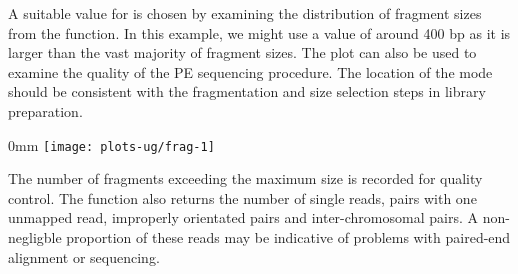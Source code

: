 \documentclass{report}\usepackage[]{graphicx}\usepackage[usenames,dvipsnames]{color}
\makeatletter
\def\maxwidth{ %
  \ifdim\Gin@nat@width>\linewidth
    \linewidth
  \else
    \Gin@nat@width
  \fi
}
\newcommand{\hlnum}[1]{\textcolor[rgb]{0.816,0.125,0.439}{#1}}%
\newcommand{\hlstr}[1]{\textcolor[rgb]{0.251,0.627,0.251}{#1}}%
\newcommand{\hlopt}[1]{\textcolor[rgb]{0,0,0}{#1}}%
\newcommand{\hlstd}[1]{\textcolor[rgb]{0.251,0.251,0.251}{#1}}%
\newcommand{\hlkwb}[1]{\textcolor[rgb]{0,0,0}{#1}}%
\newcommand{\hlkwc}[1]{\textcolor[rgb]{0.251,0.251,0.251}{#1}}%
\newcommand{\hlkwd}[1]{\textcolor[rgb]{0.878,0.439,0.125}{#1}}%
\newenvironment{knitrout}{}{} %
\makeatother
\begin{document}
\begin{knitrout}
\color{fgcolor}
\end{knitrout}

A suitable value for  is chosen by examining the distribution of fragment sizes from the  function. 
In this example, we might use a value of around 400 bp as it is larger than the vast majority of fragment sizes.
The plot can also be used to examine the quality of the PE sequencing procedure. 
The location of the mode should be consistent with the fragmentation and size selection steps in library preparation. 

\begin{knitrout}
\color{fgcolor}\begin{adjustwidth}{\fltoffset}{0mm}
\texttt{[image: plots-ug/frag-1]} \end{adjustwidth}
\end{knitrout}

The number of fragments exceeding the maximum size is recorded for quality control. 
The  function also returns the number of single reads, pairs with one unmapped read, improperly orientated pairs and inter-chromosomal pairs.
A non-negligble proportion of these reads may be indicative of problems with paired-end alignment or sequencing. 
\end{document}
